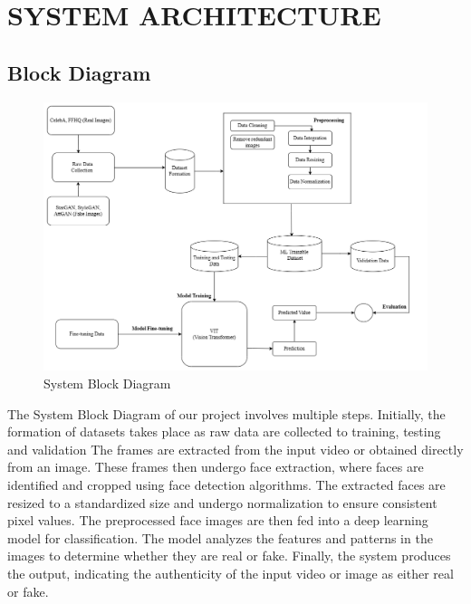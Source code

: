 \section{SYSTEM ARCHITECTURE }
\subsection{Block Diagram}
\begin{figure}[h]
    \centering
    \includegraphics[width= 6.5in ]{img/Model_Architecture.drawio (4).png}
    \caption{{System Block Diagram}}

\end{figure}
\justify
The System Block Diagram of our project involves multiple steps. Initially, the formation of datasets takes place as raw data are collected to training, testing and validation  The frames are extracted from the input video or obtained directly from an image. These frames then undergo face extraction, where faces are identified and cropped using face detection algorithms. The extracted faces are resized to a standardized size and undergo normalization to ensure consistent pixel values. The preprocessed face images are then fed into a deep learning model for classification. The model analyzes the features and patterns in the images to determine whether they are real or fake. Finally, the system produces the output, indicating the authenticity of the input video or image as either real or fake.
